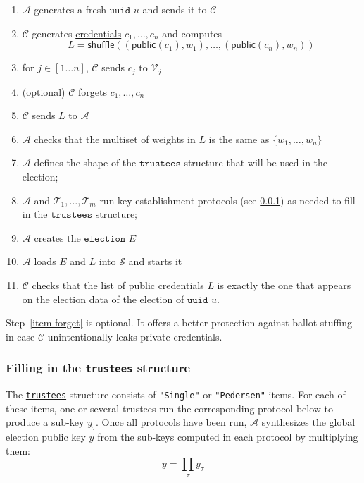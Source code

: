 \documentclass[a4paper]{article}
\newcommand{\public}{\textsf{public}}
\newcommand{\shuffle}{\textsf{shuffle}}
\newcommand{\uuid}{\texttt{uuid}}
\newcommand{\election}{\texttt{election}}
\begin{document}
\begin{enumerate}
\item $\mathcal{A}$ generates a fresh \hyperref[basic-types]{$\uuid$} $u$ and
  sends it to $\mathcal{C}$
\item $\mathcal{C}$ generates \hyperref[credentials]{credentials}
  $c_1,\dots,c_n$ and computes
  \[L=\shuffle((\public(c_1),w_1),\dots,(\public(c_n),w_n))\]
\item for $j\in[1\dots n]$, $\mathcal{C}$ sends $c_j$ to $\mathcal{V}_j$
\item \label{item-forget} (optional) $\mathcal{C}$ forgets $c_1,\dots,c_n$
 \item $\mathcal{C}$ sends $L$ to $\mathcal{A}$
 \item $\mathcal{A}$ checks that the multiset of weights in $L$ is the
   same as $\{w_1,\dots,w_n\}$
 \item $\mathcal{A}$ defines the shape of the
   \hyperref[trustees]{$\texttt{trustees}$} structure that will be
   used in the election;
 \item $\mathcal{A}$ and $\mathcal{T}_1,\dotsc,\mathcal{T}_m$ run key
   establishment protocols (see \ref{process-filling-trustees}) as
     needed to fill in the $\texttt{trustees}$ structure;
\item $\mathcal{A}$ creates the \hyperref[elections]{$\election$} $E$
\item $\mathcal{A}$ loads $E$ and $L$ into $\mathcal{S}$ and starts it
\item $\mathcal{C}$ checks that the list of public credentials $L$
  is exactly the one that appears on the election data of the election of
  {$\uuid$} $u$.
\end{enumerate}
Step~\ref{item-forget} is optional. It offers a better protection
against ballot stuffing in case $\mathcal{C}$ unintentionally leaks
private credentials.

\subsubsection{Filling in the \texttt{trustees} structure}
\label{process-filling-trustees}

The \hyperref[trustees]{\texttt{trustees}} structure consists of
\texttt{"Single"} or \texttt{"Pedersen"} items. For each of these
items, one or several trustees run the corresponding protocol below to
produce a sub-key $y_\tau$. Once all protocols have been run,
$\mathcal{A}$ synthesizes the global election public key $y$ from the
sub-keys computed in each protocol by multiplying them:
\[
  y=\prod_\tau y_\tau
\]
\end{document}
